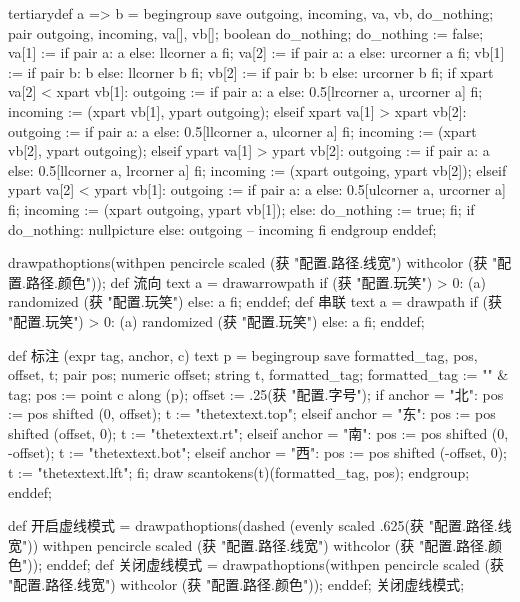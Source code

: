 \startMPinclusions[+]
tertiarydef a => b =
  begingroup
    save outgoing, incoming, va, vb, do_nothing;
    pair outgoing, incoming, va[], vb[];
    boolean do_nothing; do_nothing := false;
    va[1] := if pair a: a else: llcorner a fi;
    va[2] := if pair a: a else: urcorner a fi;
    vb[1] := if pair b: b else: llcorner b fi;
    vb[2] := if pair b: b else: urcorner b fi;
    if xpart va[2] < xpart vb[1]: %
      outgoing := if pair a: a else: 0.5[lrcorner a, urcorner a] fi;
      incoming  := (xpart vb[1], ypart outgoing);
    elseif xpart va[1] > xpart vb[2]: %
      outgoing := if pair a: a else: 0.5[llcorner a, ulcorner a] fi;
      incoming  := (xpart vb[2], ypart outgoing);
    elseif ypart va[1] > ypart vb[2]: %
      outgoing := if pair a: a else: 0.5[llcorner a, lrcorner a] fi;
      incoming  := (xpart outgoing, ypart vb[2]);
    elseif ypart va[2] < ypart vb[1]: %
      outgoing := if pair a: a else: 0.5[ulcorner a, urcorner a] fi;
      incoming  := (xpart outgoing, ypart vb[1]);
    else:
      do_nothing := true;
    fi;
    if do_nothing: nullpicture else: outgoing -- incoming fi
  endgroup
enddef;

drawpathoptions(withpen pencircle scaled (获 "配置.路径.线宽") withcolor (获 "配置.路径.颜色"));
def 流向 text a =
  drawarrowpath if (获 "配置.玩笑") > 0: (a) randomized (获 "配置.玩笑") else: a fi;
enddef;
def 串联 text a =
  drawpath if (获 "配置.玩笑") > 0: (a) randomized (获 "配置.玩笑") else: a fi;  
enddef;
\stopMPinclusions

\startMPinclusions[+]
def 标注 (expr tag, anchor, c) text p =
  begingroup
    save formatted_tag, pos, offset, t;
    pair pos; numeric offset; string t, formatted_tag;
    formatted_tag := "\tfx" & tag;
    pos := point c along (p);
    offset := .25(获 "配置.字号");
    if anchor = "北":
      pos := pos shifted (0, offset);
      t := "thetextext.top";
    elseif anchor = "东":
      pos := pos shifted (offset, 0);
      t := "thetextext.rt";
    elseif anchor = "南":
      pos := pos shifted (0, -offset);
      t := "thetextext.bot";
    elseif anchor = "西":
      pos := pos shifted (-offset, 0);
      t := "thetextext.lft";
    fi;
    draw scantokens(t)(formatted_tag, pos);
  endgroup;
enddef;
\stopMPinclusions

\startMPinclusions[+]
def 开启虚线模式 =
  drawpathoptions(dashed (evenly scaled .625(获 "配置.路径.线宽"))
                  withpen pencircle scaled (获 "配置.路径.线宽")
                  withcolor (获 "配置.路径.颜色"));
enddef;
def 关闭虚线模式 =
  drawpathoptions(withpen pencircle scaled (获 "配置.路径.线宽")
                  withcolor (获 "配置.路径.颜色"));
enddef;
关闭虚线模式;
\stopMPinclusions

